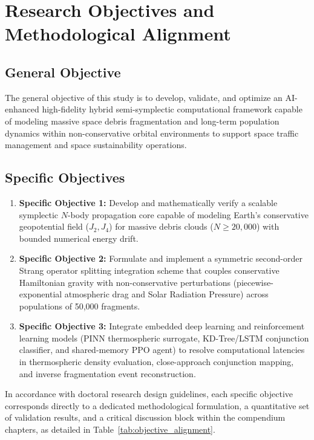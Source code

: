 \section{Research Objectives and Methodological Alignment}
\label{sec:objectives}

\subsection{General Objective}
The general objective of this study is to develop, validate, and optimize an AI-enhanced high-fidelity hybrid semi-symplectic computational framework capable of modeling massive space debris fragmentation and long-term population dynamics within non-conservative orbital environments to support space traffic management and space sustainability operations.

\subsection{Specific Objectives}
\begin{enumerate}
    \item \textbf{Specific Objective 1:} Develop and mathematically verify a scalable symplectic $N$-body propagation core capable of modeling Earth's conservative geopotential field ($J_2, J_4$) for massive debris clouds ($N \ge 20,000$) with bounded numerical energy drift.
    \item \textbf{Specific Objective 2:} Formulate and implement a symmetric second-order Strang operator splitting integration scheme that couples conservative Hamiltonian gravity with non-conservative perturbations (piecewise-exponential atmospheric drag and Solar Radiation Pressure) across populations of 50,000 fragments.
    \item \textbf{Specific Objective 3:} Integrate embedded deep learning and reinforcement learning models (PINN thermospheric surrogate, KD-Tree/LSTM conjunction classifier, and shared-memory PPO agent) to resolve computational latencies in thermospheric density evaluation, close-approach conjunction mapping, and inverse fragmentation event reconstruction.
\end{enumerate}

In accordance with doctoral research design guidelines, each specific objective corresponds directly to a dedicated methodological formulation, a quantitative set of validation results, and a critical discussion block within the compendium chapters, as detailed in Table~\ref{tab:objective_alignment}.

